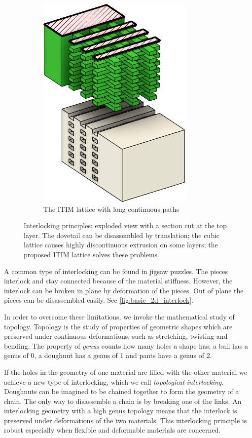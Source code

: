 \begin{figure}
\begin{subfigure}[B]{.36\columnwidth}
		\includegraphics[height=\figheight]{sources/method/basic_lattice.jpg}
		\caption{The ITIM lattice with long continuous paths}
		\label{fig:basic_structure_single_mat}
	\end{subfigure}
	\caption{Interlocking principles; exploded view with a section cut at the top layer. The dovetail can be disassembled by translation; the cubic lattice causes highly discontinuous extrusion on some layers; the proposed ITIM lattice solves these problems.}
	\label{fig:basic_structure}
\end{figure}






A common type of interlocking can be found in jigsaw puzzles.
The pieces interlock and stay connected because of the material stiffness.
However, the interlock can be broken in plane by deformation of the pieces.
Out of plane the pieces can be disassembled easily.
See \cref{fig:basic_2d_interlock}.

In order to overcome these limitations, we invoke the mathematical study of topology.
Topology is the study of properties of geometric shapes which are preserved under continuous deformations, such as stretching, twisting and bending.
The property of \emph{genus} counts how many holes a shape has;
a ball has a genus of 0, a doughnut has a genus of 1 and pants have a genus of 2.

If the holes in the geometry of one material are filled with the other material we achieve a new type of interlocking, which we call \emph{topological interlocking}.
Doughnuts can be imagined to be chained together to form the geometry of a chain.
The only way to disassemble a chain is by breaking one of the links.
An interlocking geometry with a high genus topology means that the interlock is preserved under deformations of the two materials.
This interlocking principle is robust especially when flexible and deformable materials are concerned.

